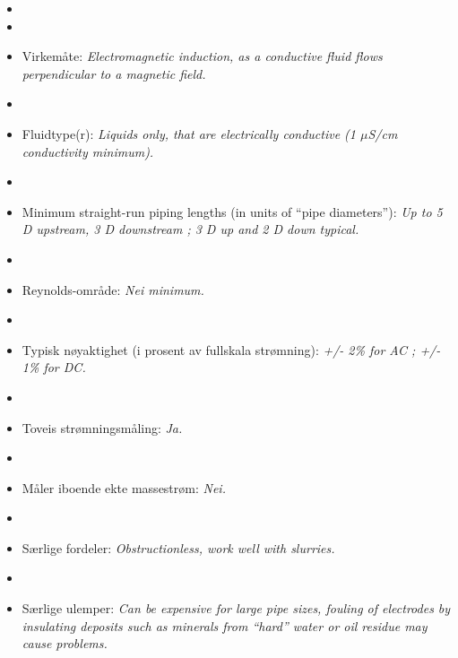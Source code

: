\begin{itemize}
\goodbreak
\item{} 
\vskip 5pt
\item\item{} Virkemåte: {\it Electromagnetic induction, as a conductive fluid flows perpendicular to a magnetic field.}
\vskip 5pt
\item\item{} Fluidtype(r): {\it Liquids only, that are electrically conductive (1 $\mu$S/cm conductivity minimum).}
\vskip 5pt
\item\item{} Minimum straight-run piping lengths (in units of ``pipe diameters''): {\it Up to 5 D upstream, 3 D downstream ; 3 D up and 2 D down typical.}
\vskip 5pt
\item\item{} Reynolds-område: {\it Nei minimum.}
\vskip 5pt
\item\item{} Typisk nøyaktighet (i prosent av fullskala strømning): {\it +/- 2\% for AC ; +/- 1\% for DC.}
\vskip 5pt
\item\item{} Toveis strømningsmåling: {\it Ja.}
\vskip 5pt
\item\item{} Måler iboende ekte massestrøm: {\it Nei.}
\vskip 5pt
\item\item{} Særlige fordeler: {\it Obstructionless, work well with slurries.}
\vskip 5pt
\item\item{} Særlige ulemper: {\it Can be expensive for large pipe sizes, fouling of electrodes by insulating deposits such as minerals from ``hard'' water or oil residue may cause problems.}
\end{itemize}

